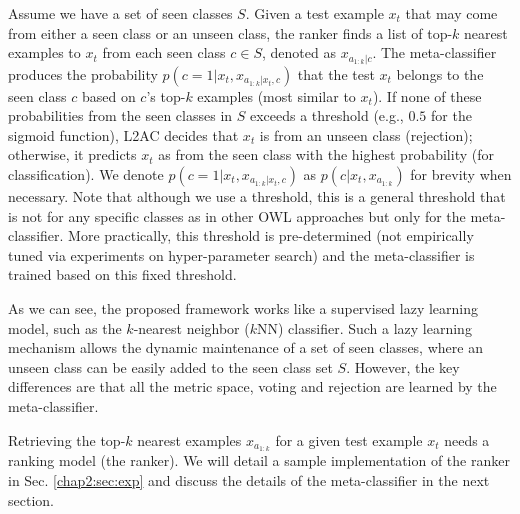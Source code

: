 Assume we have a set of seen classes $S$. 
Given a test example
$x_t$ that may come from either a seen class or an unseen class, the ranker finds a list of top-$k$ nearest examples to $x_t$ from each seen class $c \in S$, denoted as $x_{a_{1:k}|c}$.
The meta-classifier produces the probability $p(c=1|x_t, x_{a_{1:k}|x_t,c})$ that the test $x_t$ belongs to the seen class $c$ based on $c$'s top-$k$ examples (most similar to $x_t$).
If none of these probabilities from the seen classes in $S$ exceeds a threshold (e.g., $0.5$ for the sigmoid function), L2AC decides that $x_t$ is from an unseen class (rejection); otherwise, it predicts $x_t$ as from the seen class with the highest probability (for classification). 
We denote $p(c=1|x_t, x_{a_{1:k}|x_t,c})$ as $p(c|x_t, x_{a_{1:k}})$ for brevity when necessary.
Note that although we use a threshold, this is a general threshold that is not for any specific classes as in other OWL approaches but only for the meta-classifier. More practically, this threshold is pre-determined (not empirically tuned via experiments on hyper-parameter search) and the meta-classifier is trained based on this fixed threshold. 

As we can see, the proposed framework works like a supervised lazy learning model, such as the $k$-nearest neighbor ($k$NN) classifier.
Such a lazy learning mechanism allows the dynamic maintenance of a set of seen classes, where an unseen class can be easily added to the seen class set $S$. 
However, the key differences are that all the metric space, voting and rejection are learned by the meta-classifier.

Retrieving the top-$k$ nearest examples $x_{a_{1:k} }$ for a given test example $x_t$ needs a ranking model (the ranker).
We will detail a sample implementation of the ranker in Sec. \ref{chap2:sec:exp} 
and discuss the details of the meta-classifier in the next section.

